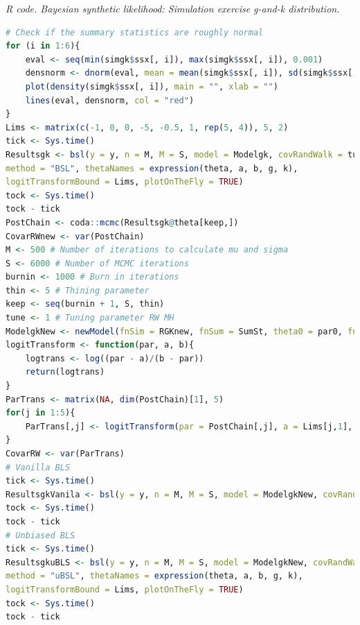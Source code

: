 \begin{enumerate}[leftmargin=*]
\begin{tcolorbox}[enhanced,width=4.67in,center upper,
	fontupper=\large\bfseries,drop shadow southwest,sharp corners]
	\textit{R code. Bayesian synthetic likelihood: Simulation exercise g-and-k distribution.}
	\begin{VF}
		\begin{lstlisting}[language=R]
# Check if the summary statistics are roughly normal
for (i in 1:6){
	eval <- seq(min(simgk$ssx[, i]), max(simgk$ssx[, i]), 0.001)
	densnorm <- dnorm(eval, mean = mean(simgk$ssx[, i]), sd(simgk$ssx[, i])) 
	plot(density(simgk$ssx[, i]), main = "", xlab = "")
	lines(eval, densnorm, col = "red")
} 
Lims <- matrix(c(-1, 0, 0, -5, -0.5, 1, rep(5, 4)), 5, 2)
tick <- Sys.time()
Resultsgk <- bsl(y = y, n = M, M = S, model = Modelgk, covRandWalk = tune*diag(5),
method = "BSL", thetaNames = expression(theta, a, b, g, k), 
logitTransformBound = Lims, plotOnTheFly = TRUE)
tock <- Sys.time()
tock - tick
PostChain <- coda::mcmc(Resultsgk@theta[keep,])
CovarRWnew <- var(PostChain)
M <- 500 # Number of iterations to calculate mu and sigma
S <- 6000 # Number of MCMC iterations
burnin <- 1000 # Burn in iterations
thin <- 5 # Thining parameter
keep <- seq(burnin + 1, S, thin)
tune <- 1 # Tuning parameter RW MH
ModelgkNew <- newModel(fnSim = RGKnew, fnSum = SumSt, theta0 = par0, fnLogPrior = LogPrior, verbose = FALSE)
logitTransform <- function(par, a, b){
	logtrans <- log((par - a)/(b - par))
	return(logtrans)
}
ParTrans <- matrix(NA, dim(PostChain)[1], 5)
for(j in 1:5){
	ParTrans[,j] <- logitTransform(par = PostChain[,j], a = Lims[j,1], b = Lims[j,2])
}
CovarRW <- var(ParTrans)
# Vanilla BLS
tick <- Sys.time()
ResultsgkVanila <- bsl(y = y, n = M, M = S, model = ModelgkNew, covRandWalk = tune*CovarRW, method = "BSL", thetaNames = expression(theta, a, b, g, k), logitTransformBound = Lims, plotOnTheFly = TRUE)
tock <- Sys.time()
tock - tick
# Unbiased BLS
tick <- Sys.time()
ResultsgkuBLS <- bsl(y = y, n = M, M = S, model = ModelgkNew, covRandWalk = tune*CovarRW,
method = "uBSL", thetaNames = expression(theta, a, b, g, k),
logitTransformBound = Lims, plotOnTheFly = TRUE)
tock <- Sys.time()
tock - tick
\end{lstlisting}
	\end{VF}
\end{tcolorbox}


\end{enumerate}
